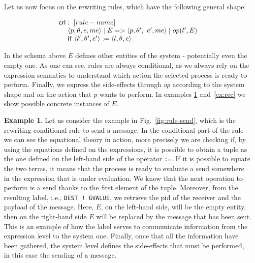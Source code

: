 \documentclass{article}[12pt,a4paper]
\theoremstyle{definition}
\newtheorem{example}{Example}[section]
\newcommand{\paral}{\;|\;}
\begin{document}
Let us now focus on the rewriting rules, which have the following general shape:

\[
  \begin{array}{l}

    \ms{crl}:~[rule-name]\\
    ~~~~\langle p, \theta, e, me \rangle \paral E => \langle p,\theta',~e', me \rangle \paral op(l', E)\\
    ~~~~\ms{if}~\langle l', \theta', e'\rangle := \langle l,\theta,e\rangle


  \end{array}
\]

In the schema above $E$ defines other entities of the system -
potentially even the empty one. As one can see, rules are always
conditional, as we always rely on the expression semantics to understand which
action the selected process is ready to perform. Finally, we express the side-effects through $op$ according to the
system shape and on the action that $p$ wants to perform. In examples
\ref{ex:send} and~\ref{ex:rec} we show possible concrete instances of $E$.  

\begin{example}\label{ex:send}
  Let us consider the example in Fig.~\ref{fig:rule-send}, which is the
  rewriting conditional rule to send a message. In the conditional part of the
  rule we can see the equational theory in action, more precisely we are
  checking if, by using the equations defined on the expressions, it is possible
  to obtain a tuple as the one defined on the left-hand side of the operator
  \verb+:=+. If it is possible to equate the two terms, it means that the
  process is ready to evaluate a send somewhere in the expression that is under
  evaluation. We know that the next operation to perform is a send thanks to the
  first element of the tuple. Moreover, from the resulting label, i.e.,
  \verb_DEST ! GVALUE_, we retrieve the pid of the receiver and the payload of
  the message. Here, $E$, on the left-hand side, will be the empty entity, then
  on the right-hand side $E$ will be replaced by the message that has been sent.
  This is an example of how the label serves to communicate information from the
  expression level to the system one. Finally, once that all the information
  have been gathered, the system level defines the side-effects that must be
  performed, in this case the sending of a message.
\end{example}


\end{document}
